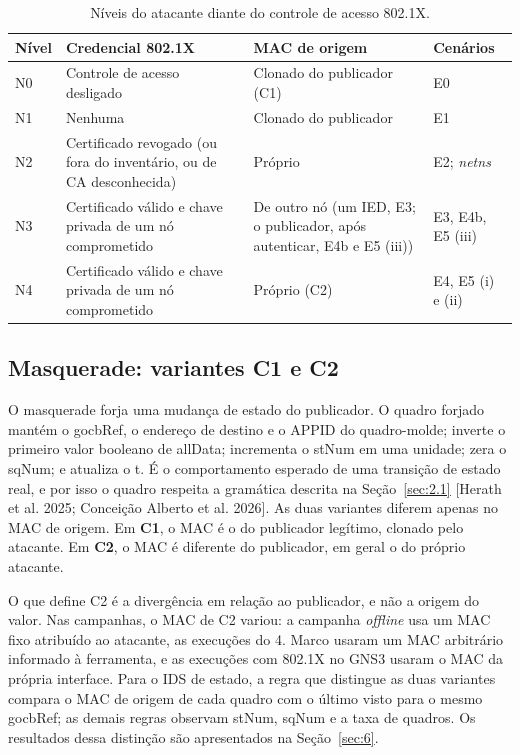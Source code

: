 \documentclass[12pt]{article}
\newcommand{\cit}[2]{[#1]\nocite{#2}}
\begin{document}
\begin{table}[!t]
\centering
\caption{Níveis do atacante diante do controle de acesso 802.1X.}\label{tab:4}
\footnotesize
\renewcommand{\arraystretch}{1.25}
\begin{tabularx}{\linewidth}{|>{\hsize=0.309\hsize\raggedright\arraybackslash}X|>{\hsize=1.960\hsize\raggedright\arraybackslash}X|>{\hsize=1.255\hsize\raggedright\arraybackslash}X|>{\hsize=0.476\hsize\raggedright\arraybackslash}X|}
\hline
\textbf{Nível} & \textbf{Credencial 802.1X} & \textbf{MAC de origem} & \textbf{Cenários} \\ \hline
N0 & Controle de acesso desligado & Clonado do publicador (C1) & E0 \\ \hline
N1 & Nenhuma & Clonado do publicador & E1 \\ \hline
N2 & Certificado revogado (ou fora do inventário, ou de CA desconhecida) & Próprio & E2; \emph{netns} \\ \hline
N3 & Certificado válido e chave privada de um nó comprometido & De outro nó (um IED, E3; o publicador, após autenticar, E4b e E5 (iii)) & E3, E4b, E5 (iii) \\ \hline
N4 & Certificado válido e chave privada de um nó comprometido & Próprio (C2) & E4, E5 (i) e (ii) \\ \hline
\end{tabularx}
\end{table}

\subsection{Masquerade: variantes C1 e C2}\label{sec:3.3}

O masquerade forja uma mudança de estado do publicador. O quadro forjado mantém o gocbRef, o endereço de destino e o APPID do quadro-molde; inverte o primeiro valor booleano de allData; incrementa o stNum em uma unidade; zera o sqNum; e atualiza o t. É o comportamento esperado de uma transição de estado real, e por isso o quadro respeita a gramática descrita na Seção~\ref{sec:2.1} \cit{Herath et al. 2025; Conceição Alberto et al. 2026}{herath2025evaluation,alberto2026gooseidrs}. As duas variantes diferem apenas no MAC de origem. Em \textbf{C1}, o MAC é o do publicador legítimo, clonado pelo atacante. Em \textbf{C2}, o MAC é diferente do publicador, em geral o do próprio atacante.

O que define C2 é a divergência em relação ao publicador, e não a origem do valor. Nas campanhas, o MAC de C2 variou: a campanha \emph{offline} usa um MAC fixo atribuído ao atacante, as execuções do 4.\textordmasculine{} Marco usaram um MAC arbitrário informado à ferramenta, e as execuções com 802.1X no GNS3 usaram o MAC da própria interface. Para o IDS de estado, a regra que distingue as duas variantes compara o MAC de origem de cada quadro com o último visto para o mesmo gocbRef; as demais regras observam stNum, sqNum e a taxa de quadros. Os resultados dessa distinção são apresentados na Seção~\ref{sec:6}.
\end{document}
